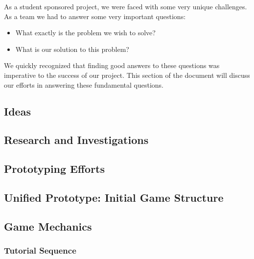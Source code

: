 As a student sponsored project, we were faced with some very unique
challenges. As a team we had to answer some very important questions:

\begin{itemize}
    \item What exactly is the problem we wish to solve?
    \item What is our solution to this problem?
\end{itemize}

We quickly recognized that finding good answers to these questions was imperative to the success of our project.
This section of the document will discuss our efforts in answering these fundamental questions.

\subsection{Ideas}
  
\newpage

\subsection{Research and Investigations}
  
\newpage

\subsection{Prototyping Efforts}
  
\newpage

\subsection{Unified Prototype: Initial Game Structure}
\newpage

\subsection{Game Mechanics}
\subsubsection{Tutorial Sequence}
\label{section:tutorial}
  
\newpage
